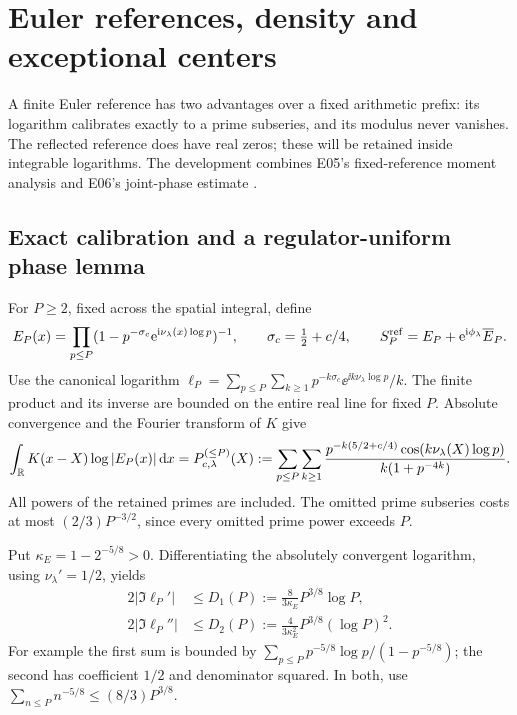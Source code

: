 \section{Euler references, density and exceptional centers}
\label{sec:euler-reference}

A finite Euler reference has two advantages over a fixed arithmetic
prefix: its logarithm calibrates exactly to a prime subseries, and
its modulus never vanishes. The reflected reference does have real
zeros; these will be retained inside integrable logarithms. The
development combines E05's fixed-reference moment analysis and E06's
joint-phase estimate \cite{GNPRSEuler,GNPRSAdaptive}.

\subsection{Exact calibration and a regulator-uniform phase lemma}
For \(P\ge2\), fixed across the spatial integral, define
\begin{equation}\label{eq:euler-reference}
 E_P(x)=\prod_{p\le P}(1-p^{-\sigma_c}
                   \mathrm e^{\mathrm i\nu_\lambda(x)\log p})^{-1},\qquad
 \sigma_c=\tfrac12+c/4,\qquad
 S_P^{\rm ref}=E_P+\mathrm e^{\mathrm i\phi_\lambda}\overline E_P.
\end{equation}
Use the canonical logarithm
\(\ell_P=\sum_{p\le P}\sum_{k\ge1}
 p^{-k\sigma_c}\ee^{\ii k\nu_\lambda\log p}/k\).
The finite product and its inverse are bounded on the entire real
line for fixed \(P\). Absolute convergence and the Fourier transform
of \(K\) give
\begin{equation}\label{eq:euler-calibration}
 \int_\mathbb R K(x-X)\log|E_P(x)|\,\mathrm d x
 =P_{c,\lambda}^{(\le P)}(X)
 :=\sum_{p\le P}\sum_{k\ge1}
 \frac{p^{-k(5/2+c/4)}\cos(k\nu_\lambda(X)\log p)}{k(1+p^{-4k})}.
\end{equation}
All powers of the retained primes are included. The omitted prime
subseries costs at most \((2/3)P^{-3/2}\), since every omitted
prime power exceeds \(P\).

Put \(\kappa_E=1-2^{-5/8}>0\). Differentiating the absolutely
convergent logarithm, using \(\nu_\lambda'=1/2\), yields
\begin{align}\label{eq:euler-phase-derivatives}
 2|\Im\ell_P'|&\le D_1(P):=\frac8{3\kappa_E}P^{3/8}\log P,\nonumber\\
 2|\Im\ell_P''|&\le D_2(P):=\frac4{3\kappa_E^2}P^{3/8}(\log P)^2.
\end{align}
For example the first sum is bounded by
\(\sum_{p\le P}p^{-5/8}\log p/(1-p^{-5/8})\); the second has
coefficient \(1/2\) and denominator squared. In both, use
\(\sum_{n\le P}n^{-5/8}\le(8/3)P^{3/8}\).

